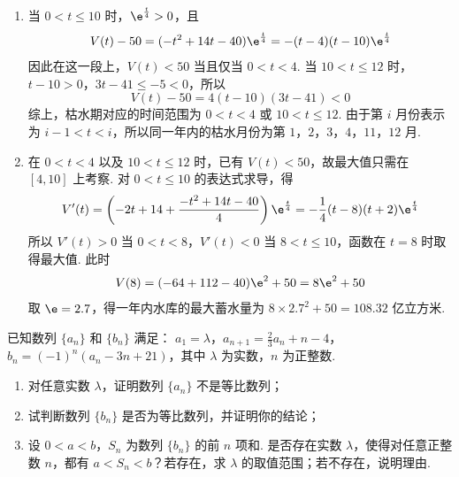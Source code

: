 \begin{solution}
\begin{enumerate}
\item 当 \(0<t\leqslant10\) 时，\(\e^{\frac{t}{4}}>0\)，且
\[
V(t)-50=(-t^{2}+14t-40)\e^{\frac{t}{4}}=-(t-4)(t-10)\e^{\frac{t}{4}}
\]
因此在这一段上，\(V(t)<50\) 当且仅当 \(0<t<4\). 当 \(10<t\leqslant12\) 时，\(t-10>0\)，\(3t-41\leqslant-5<0\)，所以
\[
V(t)-50=4(t-10)(3t-41)<0
\]
综上，枯水期对应的时间范围为 \(0<t<4\) 或 \(10<t\leqslant12\). 由于第 \(i\) 月份表示为 \(i-1<t<i\)，所以同一年内的枯水月份为第 \(1\)，\(2\)，\(3\)，\(4\)，\(11\)，\(12\) 月.

\item 在 \(0<t<4\) 以及 \(10<t\leqslant12\) 时，已有 \(V(t)<50\)，故最大值只需在 \([4,10]\) 上考察. 对 \(0<t\leqslant10\) 的表达式求导，得
\[
V'(t)=\left(-2t+14+\frac{-t^{2}+14t-40}{4}\right)\e^{\frac{t}{4}}=-\frac14(t-8)(t+2)\e^{\frac{t}{4}}
\]
所以 \(V'(t)>0\) 当 \(0<t<8\)，\(V'(t)<0\) 当 \(8<t\leqslant10\)，函数在 \(t=8\) 时取得最大值. 此时
\[
V(8)=(-64+112-40)\e^{2}+50=8\e^{2}+50
\]
取 \(\e=2.7\)，得一年内水库的最大蓄水量为 \(8\times2.7^{2}+50=108.32\) 亿立方米.
\end{enumerate}
\end{solution}


\begin{problem}
已知数列 \(\{a_{n}\}\) 和 \(\{b_{n}\}\) 满足： \(a_1 = \lambda\)，\(a_{n + 1} = \frac{2}{3} a_n + n - 4\)，\(b_n = (-1)^n (a_n - 3n + 21)\)，其中 \(\lambda\) 为实数，\(n\) 为正整数.
\begin{enumerate}
\item 对任意实数 \(\lambda\)，证明数列 \(\{a_{n}\}\) 不是等比数列；
\item 试判断数列 \(\{b_n\}\) 是否为等比数列，并证明你的结论；
\item 设 \(0 < a < b\)，\(S_{n}\) 为数列 \(\{b_{n}\}\) 的前 \(n\) 项和. 是否存在实数 \(\lambda\)，使得对任意正整数 \(n\)，都有 \(a < S_{n} < b\)？若存在，求 \(\lambda\) 的取值范围；若不存在，说明理由.
\end{enumerate}
\end{problem}

